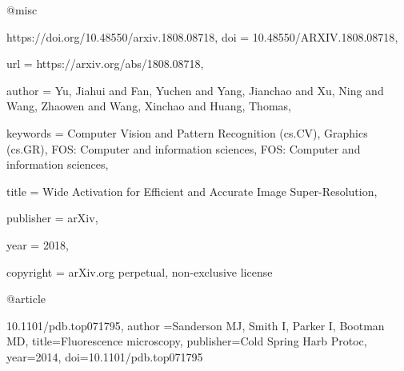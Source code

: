 @misc{https://doi.org/10.48550/arxiv.1808.08718,
  doi = {10.48550/ARXIV.1808.08718},
  
  url = {https://arxiv.org/abs/1808.08718},
  
  author = {Yu, Jiahui and Fan, Yuchen and Yang, Jianchao and Xu, Ning and Wang, Zhaowen and Wang, Xinchao and Huang, Thomas},
  
  keywords = {Computer Vision and Pattern Recognition (cs.CV), Graphics (cs.GR), FOS: Computer and information sciences, FOS: Computer and information sciences},
  
  title = {Wide Activation for Efficient and Accurate Image Super-Resolution},
  
  publisher = {arXiv},
  
  year = {2018},
  
  copyright = {arXiv.org perpetual, non-exclusive license}
}

@article{10.1101/pdb.top071795,
author ={Sanderson MJ, Smith I, Parker I, Bootman MD},
title={Fluorescence microscopy},
publisher={Cold Spring Harb Protoc},
year={2014},
doi={10.1101/pdb.top071795}

}